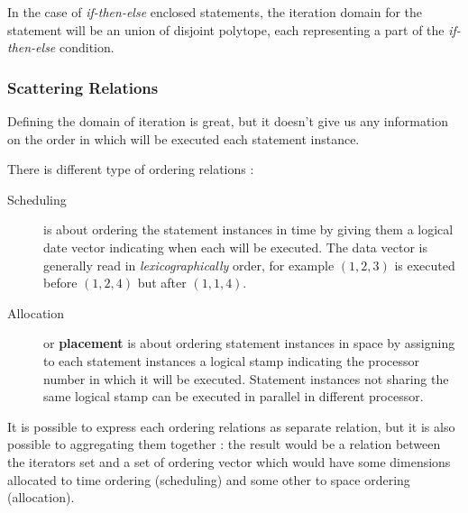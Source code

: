 \documentclass[paper=a4, fontsize=11pt]{scrartcl}
\numberwithin{equation}{section}        %
\numberwithin{figure}{section}          %
\numberwithin{table}{section}               %
\begin{document}
                In the case of \textit{if-then-else} enclosed statements, the iteration domain
                for the statement will be an union of disjoint polytope, each representing a part
                of the \textit{if-then-else} condition.

            \subsubsection{Scattering Relations}
                Defining the domain of iteration is great, but it doesn't give us any information
                on the order in which will be executed each statement instance.

                There is different type of ordering relations :
                \begin{description}
                    \item[Scheduling] is about ordering the statement instances in time by
                        giving them a logical date vector indicating when each will be executed.
                        The data vector is generally read in \textit{lexicographically} order, for example
                        $(1,2,3)$ is executed before $(1,2,4)$ but after $(1,1,4)$.
                    \item[Allocation] or \textbf{placement} is about ordering statement instances
                        in space by assigning to each statement instances a logical stamp
                        indicating the processor number in which it will be executed.
                        Statement instances not sharing the same logical stamp can be
                        executed in parallel in different processor.
                \end{description}

                It is possible to express each ordering relations as separate relation,
                but it is also possible to aggregating them together : the result would be
                a relation between the iterators set and a set of ordering vector which
                would have some dimensions allocated to time ordering (scheduling) and
                some other to space ordering (allocation).
\end{document}
